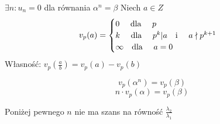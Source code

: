 \documentclass[handout]{beamer}
\def\Z{\mathbb Z}
\theoremstyle{definition}
\newtheorem*{definicja}{Definicja}
\theoremstyle{named}
\begin{document}


\begin{frame}{$\exists n: u_n = 0$ dla równania $\alpha^{n} = \beta$}
Niech $a \in Z$
\begin{equation}
v_p(a)= 
    \begin{cases}
        0 \text{ \quad dla \quad } p \\
        k \text{ \quad dla \quad } p^{k} | a  \text{\quad i \quad } a \nmid p^{k+1} \\
        \infty \text{\quad dla \quad} a= 0
    \end{cases}
\end{equation}
Własność:
$v_p(\frac{a}{b}) = v_p(a) - v_p(b)$


\[
    v_{p}(\alpha^{n}) = v_p(\beta) 
\]
\[
    n \cdot v_{p}(\alpha) = v_{p}(\beta)
\]

Poniżej pewnego $n$ nie ma szans na równość $\frac{\lambda_2}{\lambda_1}$

\end{frame}
\end{document}
